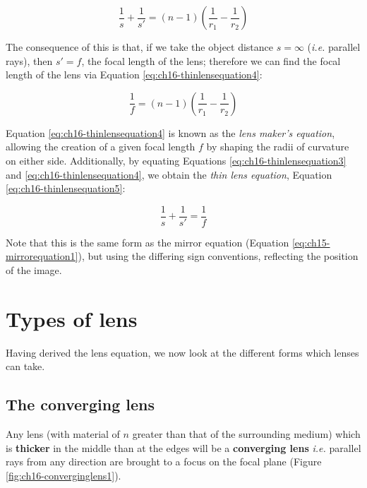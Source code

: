 \documentclass[
]{book}
\begin{document}
\begin{equation}
\frac{1}{s} + \frac{1}{s'} = (n-1)\left( \frac{1}{r_1} - \frac{1}{r_2}\right)
\label{eq:ch16-thinlensequation3}
\end{equation}

The consequence of this is that, if we take the object distance \(s = \infty\) (\emph{i.e.} parallel rays), then \(s' = f\), the focal length of the lens; therefore we can find the focal length of the lens via Equation \eqref{eq:ch16-thinlensequation4}:

\begin{equation}
\frac{1}{f} = (n-1) \left(  \frac{1}{r_1} - \frac{1}{r_2} \right)
\label{eq:ch16-thinlensequation4}
\end{equation}

Equation \eqref{eq:ch16-thinlensequation4} is known as the \emph{lens maker's equation}, allowing the creation of a given focal length \(f\) by shaping the radii of curvature on either side. Additionally, by equating Equations \eqref{eq:ch16-thinlensequation3} and \eqref{eq:ch16-thinlensequation4}, we obtain the \emph{thin lens equation}, Equation \eqref{eq:ch16-thinlensequation5}:

\begin{equation}
\frac{1}{s} + \frac{1}{s'} = \frac{1}{f}
\label{eq:ch16-thinlensequation5}
\end{equation}

Note that this is the same form as the mirror equation (Equation \eqref{eq:ch15-mirrorequation1}), but using the differing sign conventions, reflecting the position of the image.

\hypertarget{types-of-lens}{%
\section{Types of lens}\label{types-of-lens}}

Having derived the lens equation, we now look at the different forms which lenses can take.

\hypertarget{sec-ch16-converginglens1}{%
\subsection{The converging lens}\label{sec-ch16-converginglens1}}

Any lens (with material of \(n\) greater than that of the surrounding medium) which is \textbf{thicker} in the middle than at the edges will be a \textbf{converging lens} \emph{i.e.} parallel rays from any direction are brought to a focus on the focal plane (Figure \ref{fig:ch16-converginglens1}).
\end{document}
